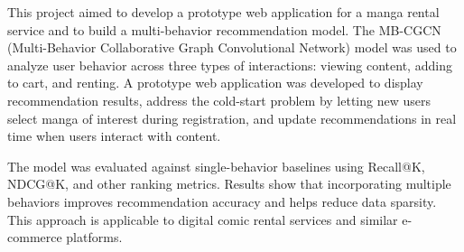 
This project aimed to develop a prototype web application for a manga rental service and to build a multi-behavior recommendation model. The MB-CGCN (Multi-Behavior Collaborative Graph Convolutional Network) model was used to analyze user behavior across three types of interactions: viewing content, adding to cart, and renting. A prototype web application was developed to display recommendation results, address the cold-start problem by letting new users select manga of interest during registration, and update recommendations in real time when users interact with content.

The model was evaluated against single-behavior baselines using Recall@K, NDCG@K, and other ranking metrics. Results show that incorporating multiple behaviors improves recommendation accuracy and helps reduce data sparsity. This approach is applicable to digital comic rental services and similar e-commerce platforms.
